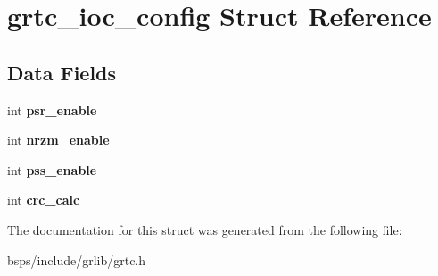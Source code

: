 \hypertarget{structgrtc__ioc__config}{}\section{grtc\+\_\+ioc\+\_\+config Struct Reference}
\label{structgrtc__ioc__config}
\subsection*{Data Fields}
\begin{DoxyCompactItemize}
\item 
\mbox{\label{structgrtc__ioc__config_a67c5f64455e38409227a2d1fd03aa3a0}} 
int {\bfseries psr\+\_\+enable}
\item 
\mbox{\label{structgrtc__ioc__config_a2691326d66e94d8e56e7d06d863874b0}} 
int {\bfseries nrzm\+\_\+enable}
\item 
\mbox{\label{structgrtc__ioc__config_a4aad8e64189c7f232d262156e27e9fe3}} 
int {\bfseries pss\+\_\+enable}
\item 
\mbox{\label{structgrtc__ioc__config_a0b05eefc3a8e5cc3864726d4a3d0d90e}} 
int {\bfseries crc\+\_\+calc}
\end{DoxyCompactItemize}


The documentation for this struct was generated from the following file\+:\begin{DoxyCompactItemize}
\item 
bsps/include/grlib/grtc.\+h\end{DoxyCompactItemize}
